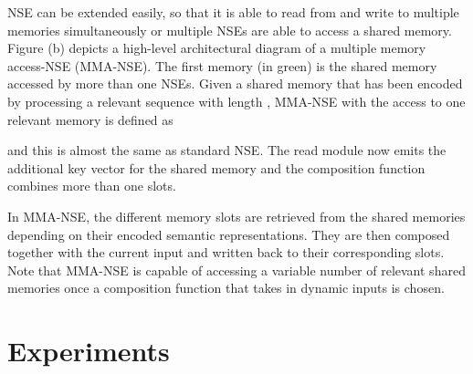 \documentclass{article}
\begin{document}
NSE can be extended easily, so that it is able to read from and write to multiple memories simultaneously or multiple NSEs are able to access a shared memory. Figure  (b) depicts a high-level architectural diagram of a multiple memory access-NSE (MMA-NSE). The first memory (in green) is the shared memory accessed by more than one NSEs. Given a shared memory  that has been encoded by processing a relevant sequence with length , MMA-NSE with the access to one relevant memory is defined as










and this is almost the same as standard NSE. The read module now emits the additional key vector  for the shared memory and the composition function  combines more than one slots.

In MMA-NSE, the different memory slots are retrieved from the shared memories depending on their encoded semantic representations. They are then composed together with the current input and written back to their corresponding slots. Note that MMA-NSE is capable of accessing a variable number of relevant shared memories once a composition function that takes in dynamic inputs is chosen.







\section{Experiments}
\end{document}
